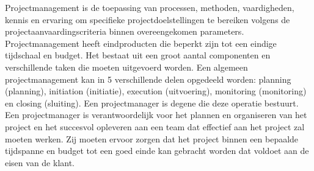 \documentclass{hogent-article}
\begin{document}
    Projectmanagement is de toepassing van processen, methoden, vaardigheden, kennis en ervaring om specifieke projectdoelstellingen te bereiken volgens de projectaanvaardingscriteria binnen overeengekomen parameters. Projectmanagement heeft eindproducten die beperkt zijn tot een eindige tijdschaal en budget. Het bestaat uit een groot aantal componenten en verschillende taken die moeten uitgevoerd worden. Een algemeen projectmanagement kan in 5 verschillende delen opgedeeld worden: planning (planning), initiation (initiatie), execution (uitvoering), monitoring (monitoring) en closing (sluiting). Een projectmanager is degene die deze operatie bestuurt. Een projectmanager is verantwoordelijk voor het plannen en organiseren van het project en het succesvol opleveren aan een team dat effectief aan het project zal moeten werken. Zij moeten ervoor zorgen dat het project binnen een bepaalde tijdspanne en budget tot een goed einde kan gebracht worden dat voldoet aan de eisen van de klant. 
    
\end{document}
